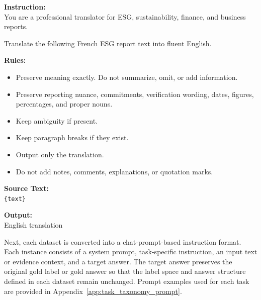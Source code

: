\documentclass[11pt]{article}
\begin{document}

\begin{center}
\begin{tcolorbox}[
    breakable,
    enhanced jigsaw,
    width=0.95\linewidth,
    colback=white,
    colframe=black,
    coltitle=white,
    colbacktitle=black,
    title=\textbf{Translation Prompt},
    fonttitle=\bfseries,
    boxrule=0.8pt,
    arc=2mm,
    left=6pt,
    right=6pt,
    top=6pt,
    bottom=6pt,
    before skip=6pt,
    after skip=6pt
]
\small
\textbf{Instruction:}\\
You are a professional translator for ESG, sustainability, finance, and business reports.

\vspace{0.5em}
Translate the following French ESG report text into fluent English.

\vspace{0.5em}
\textbf{Rules:}
\begin{itemize}
    \setlength{\itemsep}{0pt}
    \setlength{\leftmargin}{1.2em}
    \item Preserve meaning exactly. Do not summarize, omit, or add information.
    \item Preserve reporting nuance, commitments, verification wording, dates, figures, percentages, and proper nouns.
    \item Keep ambiguity if present.
    \item Keep paragraph breaks if they exist.
    \item Output only the translation.
    \item Do not add notes, comments, explanations, or quotation marks.
\end{itemize}

\textbf{Source Text:}\\
\texttt{\{text\}}

\vspace{0.5em}
\textbf{Output:}\\
English translation
\end{tcolorbox}
\end{center}
Next, each dataset is converted into a chat-prompt-based instruction format. Each instance consists of a system prompt, task-specific instruction, an input text or evidence context, and a target answer. The target answer preserves the original gold label or gold answer so that the label space and answer structure defined in each dataset remain unchanged. Prompt examples used for each task are provided in Appendix~\ref{app:task_taxonomy_prompt}.
\end{document}

